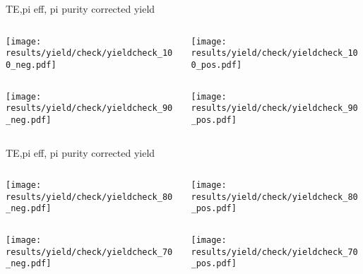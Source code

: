 \begin{frame}{TE,pi eff, pi purity corrected yield}
\begin{columns}
\begin{column}[T]{0.5\textwidth}
\texttt{[image: results/yield/check/yieldcheck\_100\_neg.pdf]}
\end{column}
\begin{column}[T]{0.5\textwidth}
\texttt{[image: results/yield/check/yieldcheck\_100\_pos.pdf]}
\end{column}
\end{columns}
\begin{columns}
\begin{column}[T]{0.5\textwidth}
\texttt{[image: results/yield/check/yieldcheck\_90\_neg.pdf]}
\end{column}
\begin{column}[T]{0.5\textwidth}
\texttt{[image: results/yield/check/yieldcheck\_90\_pos.pdf]}
\end{column}
\end{columns}
\end{frame}
\begin{frame}{TE,pi eff, pi purity corrected yield}
\begin{columns}
\begin{column}[T]{0.5\textwidth}
\texttt{[image: results/yield/check/yieldcheck\_80\_neg.pdf]}
\end{column}
\begin{column}[T]{0.5\textwidth}
\texttt{[image: results/yield/check/yieldcheck\_80\_pos.pdf]}
\end{column}
\end{columns}
\begin{columns}
\begin{column}[T]{0.5\textwidth}
\texttt{[image: results/yield/check/yieldcheck\_70\_neg.pdf]}
\end{column}
\begin{column}[T]{0.5\textwidth}
\texttt{[image: results/yield/check/yieldcheck\_70\_pos.pdf]}
\end{column}
\end{columns}
\end{frame}
